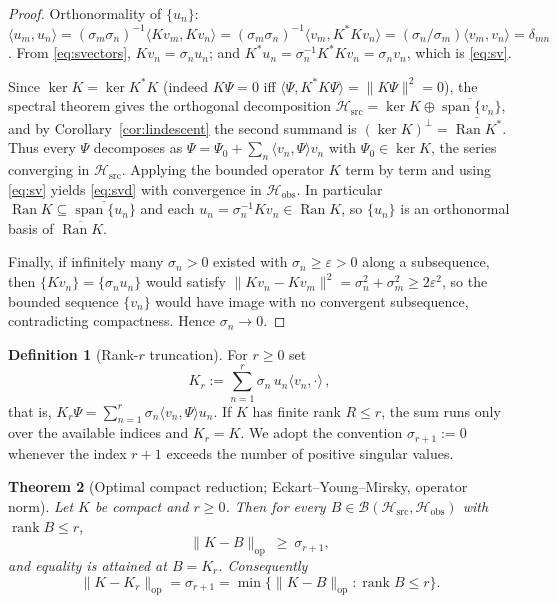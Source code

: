 \documentclass[11pt,reqno]{amsart}
\numberwithin{equation}{section}
\theoremstyle{plain}
\newtheorem{theorem}{Theorem}[section]
\theoremstyle{definition}
\newtheorem{definition}[theorem]{Definition}
\theoremstyle{remark}
\newcommand{\Hsrc}{\mathcal{H}_{\mathrm{src}}}
\newcommand{\Hobs}{\mathcal{H}_{\mathrm{obs}}}
\newcommand{\Ran}{\operatorname{Ran}}
\newcommand{\inner}[2]{\langle #1 , #2 \rangle}
\DeclareMathOperator{\Rank}{rank}
\DeclareMathOperator{\spanset}{span}
\begin{document}
\begin{proof}
Orthonormality of $\{u_n\}$: $\inner{u_{m}}{u_{n}}=(\sigma_{m}\sigma_{n})^{-1}
\inner{Kv_{m}}{Kv_{n}}=(\sigma_{m}\sigma_{n})^{-1}\inner{v_{m}}{K^{*}Kv_{n}}
=(\sigma_{n}/\sigma_{m})\inner{v_{m}}{v_{n}}=\delta_{mn}$. From \eqref{eq:svectors},
$Kv_{n}=\sigma_{n}u_{n}$; and $K^{*}u_{n}=\sigma_{n}^{-1}K^{*}Kv_{n}=\sigma_{n}v_{n}$, which
is \eqref{eq:sv}.

Since $\ker K=\ker K^{*}K$ (indeed $K\Psi=0$ iff
$\inner{\Psi}{K^{*}K\Psi}=\lVert K\Psi\rVert^{2}=0$), the spectral theorem gives the
orthogonal decomposition $\Hsrc=\ker K\oplus\overline{\spanset\{v_{n}\}}$, and by
Corollary~\ref{cor:lindescent} the second summand is $(\ker K)^{\perp}=\overline{\Ran K^{*}}$.
Thus every $\Psi$ decomposes as $\Psi=\Psi_{0}+\sum_{n}\inner{v_{n}}{\Psi}v_{n}$ with
$\Psi_{0}\in\ker K$, the series converging in $\Hsrc$. Applying the bounded operator $K$
term by term and using \eqref{eq:sv} yields \eqref{eq:svd} with convergence in $\Hobs$. In
particular $\Ran K\subseteq\overline{\spanset\{u_{n}\}}$ and each $u_{n}=\sigma_{n}^{-1}Kv_{n}
\in\Ran K$, so $\{u_{n}\}$ is an orthonormal basis of $\overline{\Ran K}$.

Finally, if infinitely many $\sigma_{n}>0$ existed with $\sigma_{n}\ge\varepsilon>0$ along a
subsequence, then $\{Kv_{n}\}=\{\sigma_{n}u_{n}\}$ would satisfy
$\lVert Kv_{n}-Kv_{m}\rVert^{2}=\sigma_{n}^{2}+\sigma_{m}^{2}\ge2\varepsilon^{2}$, so the
bounded sequence $\{v_{n}\}$ would have image with no convergent subsequence, contradicting
compactness. Hence $\sigma_{n}\to0$.
\end{proof}

\begin{definition}[Rank-$r$ truncation]
\label{def:trunc}
For $r\ge0$ set
\begin{equation}
\label{eq:Kr}
K_{r}:=\sum_{n=1}^{r}\sigma_{n}\,u_{n}\inner{v_{n}}{\cdot}\, ,
\end{equation}
that is, $K_{r}\Psi=\sum_{n=1}^{r}\sigma_{n}\inner{v_{n}}{\Psi}u_{n}$. If $K$ has finite rank
$R\le r$, the sum runs only over the available indices and $K_{r}=K$. We adopt the
convention $\sigma_{r+1}:=0$ whenever the index $r+1$ exceeds the number of positive
singular values.
\end{definition}

\begin{theorem}[Optimal compact reduction; Eckart--Young--Mirsky, operator norm]
\label{thm:ey}
Let $K$ be compact and $r\ge0$. Then for every $B\in\mathcal{B}(\Hsrc,\Hobs)$ with
$\Rank B\le r$,
\begin{equation}
\label{eq:eylower}
\lVert K-B\rVert_{\mathrm{op}}\ \ge\ \sigma_{r+1},
\end{equation}
and equality is attained at $B=K_{r}$. Consequently
\begin{equation}
\label{eq:ey}
\lVert K-K_{r}\rVert_{\mathrm{op}}=\sigma_{r+1}
=\min\bigl\{\lVert K-B\rVert_{\mathrm{op}}:\Rank B\le r\bigr\}.
\end{equation}
\end{theorem}
\end{document}
